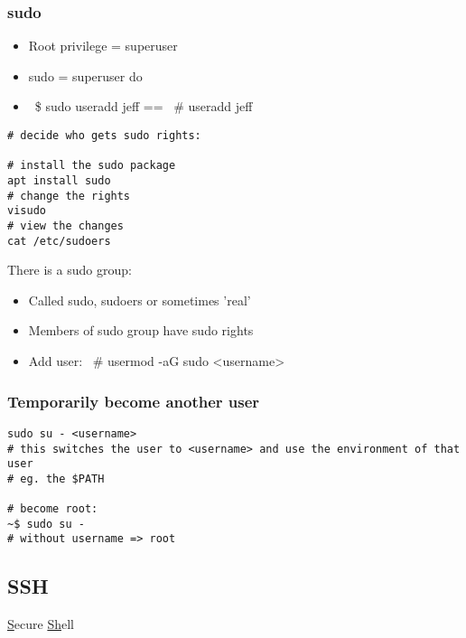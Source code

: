 \documentclass{article}
\begin{document}
\subsubsection{sudo}

\begin{itemize}
    \item Root privilege = superuser
    \item sudo = superuser do
    \item ~\$ sudo useradd jeff == ~\# useradd jeff
\end{itemize}

\begin{verbatim}
# decide who gets sudo rights:

# install the sudo package
apt install sudo
# change the rights
visudo
# view the changes
cat /etc/sudoers
\end{verbatim}

There is a sudo group:

\begin{itemize}
    \item Called sudo, sudoers or sometimes 'real'
    \item Members of sudo group have sudo rights
    \item Add user: ~\# usermod -aG sudo <username>
\end{itemize}

\subsubsection{Temporarily become another user}

\begin{verbatim}
sudo su - <username>
# this switches the user to <username> and use the environment of that user
# eg. the $PATH

# become root:
~$ sudo su -
# without username => root
\end{verbatim}


\subsection{SSH}

\underline{S}ecure \underline{Sh}ell
\end{document}
